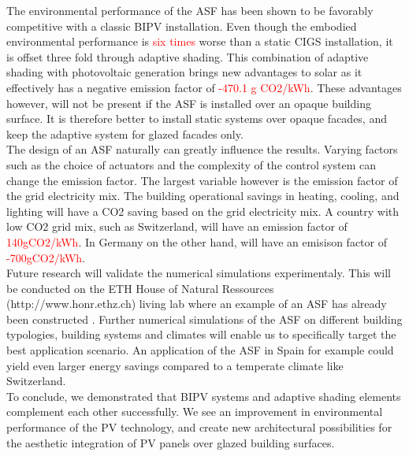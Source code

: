 
The environmental performance of the ASF has been shown to be favorably competitive with a classic BIPV installation. Even though the embodied environmental performance is \textcolor{red}{six times} worse than a static CIGS installation, it is offset three fold through adaptive shading. This combination of adaptive shading with photovoltaic generation brings new advantages to solar as it effectively has a negative emission factor of \textcolor{red}{-470.1 g CO2/kWh}. These advantages however, will not be present if the ASF is installed over an opaque building surface. It is therefore better to install static systems over opaque facades, and keep the adaptive system for glazed facades only. \\

The design of an ASF naturally can greatly influence the results. Varying factors such as the choice of actuators and the complexity of the control system can change the emission factor. The largest variable however is the emission factor of the grid electricity mix. The building operational savings in heating, cooling, and lighting will have a CO2 saving based on the grid electricity mix. A country with low CO2 grid mix, such as Switzerland, will have an emission factor of \textcolor{red}{140gCO2/kWh}. In Germany on the other hand, will have an emisison factor of \textcolor{red}{-700gCO2/kWh}.\\

Future research will validate the numerical simulations experimentaly. This will be conducted on the ETH House of Natural Ressources (http://www.honr.ethz.ch) living lab where an example of an ASF has already been constructed \cite{nagy2015frontiers}. Further numerical simulations of the ASF on different building typologies, building systems and climates will enable us to specifically target the best application scenario. An application of the ASF in Spain for example could yield even larger energy savings compared to a temperate climate like Switzerland.\\

To conclude, we demonstrated that BIPV systems and adaptive shading elements complement each other successfully. We see an improvement in environmental performance of the PV technology, and create new architectural possibilities for the aesthetic integration of PV panels over glazed building surfaces. 



